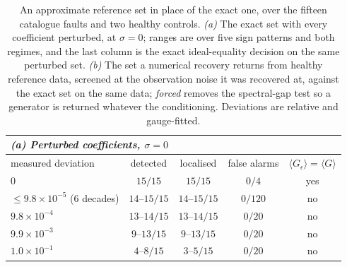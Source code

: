 \documentclass{article}
\begin{document}
\begin{table}[t]
\caption{An approximate reference set in place of the exact one, over the
fifteen catalogue faults and two healthy controls. \emph{(a)} The exact set with
every coefficient perturbed, at $\sigma = 0$; ranges are over five sign patterns
and both regimes, and the last column is the exact ideal-equality decision on the
same perturbed set. \emph{(b)} The set a numerical recovery returns from healthy
reference data, screened at the observation noise it was recovered at, against
the exact set on the same data; \emph{forced} removes the spectral-gap test so a
generator is returned whatever the conditioning. Deviations are relative and
gauge-fitted.}
\label{tab:approx}
\centering
\small
\begin{tabular}{lcccc}
\multicolumn{5}{l}{\emph{(a) Perturbed coefficients, $\sigma = 0$}} \\
\toprule
measured deviation & detected & localised & false alarms
  & $\langle G_\epsilon\rangle = \langle G\rangle$ \\
\midrule
$0$                                 & $15/15$    & $15/15$    & $0/4$   & yes \\
$\le 9.8\times10^{-5}$ (6 decades)  & $14$--$15/15$ & $14$--$15/15$ & $0/120$ & no  \\
$9.8\times10^{-4}$                  & $13$--$14/15$ & $13$--$14/15$ & $0/20$ & no \\
$9.9\times10^{-3}$                  & $9$--$13/15$  & $9$--$13/15$  & $0/20$ & no \\
$1.0\times10^{-1}$                  & $4$--$8/15$   & $3$--$5/15$   & $0/20$ & no \\
\bottomrule
\end{tabular}

\vspace{1.2ex}


\end{table}
\end{document}
